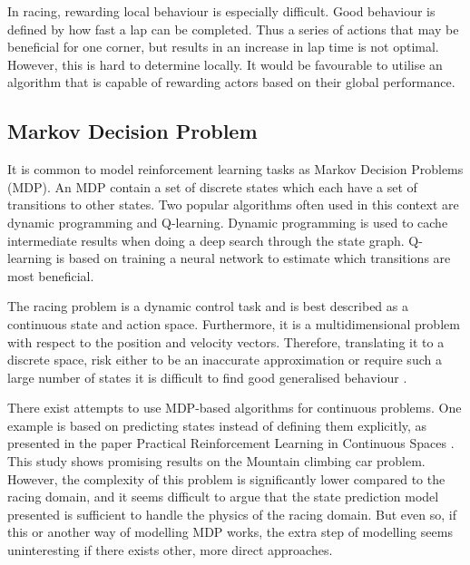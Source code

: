 In racing, rewarding local behaviour is especially difficult. Good behaviour is defined by how fast a lap can be completed. Thus a series of actions that may be beneficial for one corner, but results in an increase in lap time is not optimal. However, this is hard to determine locally. It would be favourable to utilise an algorithm that is capable of rewarding actors based on their global performance.

\subsection{Markov Decision Problem}
It is common to model reinforcement learning tasks as Markov Decision Problems (MDP). An MDP contain a set of discrete states which each have a set of transitions to other states. Two popular algorithms often used in this context are dynamic programming and Q-learning. Dynamic programming is used to cache intermediate results when doing a deep search through the state graph. Q-learning is based on training a neural network to estimate which transitions are most beneficial. 

The racing problem is a dynamic control task and is best described as a continuous state and action space. Furthermore, it is a multidimensional problem with respect to the position and velocity vectors. Therefore, translating it to a discrete space, risk either to be an inaccurate approximation or require such a large number of states it is difficult to find good generalised behaviour \cite{smart}. 

There exist attempts to use MDP-based algorithms for continuous problems. One example is based on predicting states instead of defining them explicitly, as presented in the paper Practical Reinforcement Learning in Continuous Spaces \cite{smart}. This study shows promising results on the Mountain climbing car problem. However, the complexity of this problem is significantly lower compared to the racing domain, and it seems difficult to argue that the state prediction model presented is sufficient to handle the physics of the racing domain. But even so, if this or another way of modelling MDP works, the extra step of modelling seems uninteresting if there exists other, more direct approaches.



